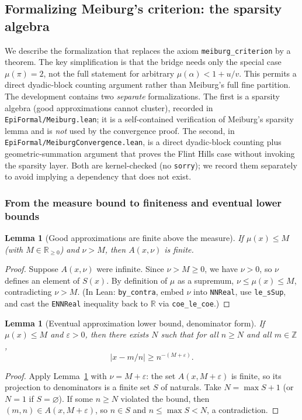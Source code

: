 \documentclass[11pt]{amsart}
\newtheorem{lemma}[theorem]{Lemma}
\theoremstyle{definition}
\theoremstyle{remark}
\numberwithin{equation}{section}
\newcommand{\R}{\mathbb{R}}
\newcommand{\Z}{\mathbb{Z}}
\newcommand{\irr}{\mu}
\begin{document}
\subsection{Formalizing Meiburg's criterion: the sparsity algebra}\label{sec:lean-f2}

We describe the formalization that replaces the axiom \texttt{meiburg\_criterion} by a theorem. The key simplification is that the bridge needs only the special case $\irr(\pi)=2$, not the full statement for arbitrary $\irr(\alpha)<1+u/v$. This permits a direct dyadic-block counting argument rather than Meiburg's full fine partition. The development contains two \emph{separate} formalizations. The first is a sparsity algebra (good approximations cannot cluster), recorded in \texttt{EpiFormal/\allowbreak{}Meiburg.lean}; it is a self-contained verification of Meiburg's sparsity lemma and is \emph{not} used by the convergence proof. The second, in \texttt{EpiFormal/\allowbreak{}MeiburgConvergence.lean}, is a direct dyadic-block counting plus geometric-summation argument that proves the Flint Hills case without invoking the sparsity layer. Both are kernel-checked (no \texttt{sorry}); we record them separately to avoid implying a dependency that does not exist.

\subsubsection{From the measure bound to finiteness and eventual lower bounds}

\begin{lemma}[Good approximations are finite above the measure]\label{lem:f2-finite}
If $\irr(x)\le M$ (with $M\in\R_{\ge0}$) and $\nu>M$, then $A(x,\nu)$ is finite.
\end{lemma}
\begin{proof}
Suppose $A(x,\nu)$ were infinite. Since $\nu>M\ge0$, we have $\nu>0$, so $\nu$ defines an element of $S(x)$. By definition of $\irr$ as a supremum, $\nu\le\irr(x)\le M$, contradicting $\nu>M$. (In Lean: \texttt{by\_contra}, embed $\nu$ into \texttt{NNReal}, use \texttt{le\_sSup}, and cast the \texttt{ENNReal} inequality back to $\R$ via \texttt{coe\_le\_coe}.)
\end{proof}

\begin{lemma}[Eventual approximation lower bound, denominator form]\label{lem:f2-eventual}
If $\irr(x)\le M$ and $\varepsilon>0$, then there exists $N$ such that for all $n\ge N$ and all $m\in\Z$,
\[
|x-m/n|\ge n^{-(M+\varepsilon)}.
\]
\end{lemma}
\begin{proof}
Apply Lemma~\ref{lem:f2-finite} with $\nu=M+\varepsilon$: the set $A(x,M+\varepsilon)$ is finite, so its projection to denominators is a finite set $S$ of naturals. Take $N=\max S+1$ (or $N=1$ if $S=\varnothing$). If some $n\ge N$ violated the bound, then $(m,n)\in A(x,M+\varepsilon)$, so $n\in S$ and $n\le\max S<N$, a contradiction.
\end{proof}
\end{document}
